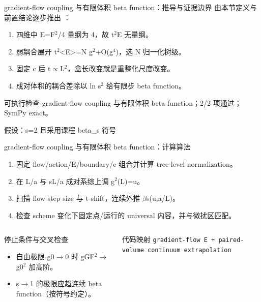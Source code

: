 \begin{frame}[t]{gradient-flow coupling 与有限体积 beta function：推导与证据边界}
\footnotesize
{}\quad 由本节定义与前置结论逐步推出 ：
\begin{enumerate}
\item 四维中 E=F\ensuremath{^{2}}/\allowbreak{}4 量纲为 4，故 t\ensuremath{^{2}}E 无量纲。
\item 弱耦合展开 t\ensuremath{^{2}}<E>=N g\ensuremath{^{2}}+O(g\ensuremath{^{4}})，选 N 归一化树级。
\item 固定 c 后 t\ensuremath{\propto}L\ensuremath{^{2}}，盒长改变就是重整化尺度改变。
\item 成对体积的耦合差除以 ln s\ensuremath{^{2}} 给有限步 beta function。
\end{enumerate}\begin{block}{可执行检查}
\quad gradient-flow coupling 与有限体积 beta function；2/2 项通过；SymPy exact。
\par\scriptsize 假设：s=2 且采用课程 beta\_s 符号
\end{block}
\end{frame}

\begin{frame}[t]{gradient-flow coupling 与有限体积 beta function：计算算法}
\footnotesize
{}\begin{enumerate}
\item 固定 flow/\allowbreak{}action/\allowbreak{}E/\allowbreak{}boundary/\allowbreak{}c 组合并计算 tree-level normalization。
\item 在 L/\allowbreak{}a 与 sL/\allowbreak{}a 成对系综上调 g\ensuremath{^{2}}(L)=u。
\item 扫描 flow step size 与 t-shift，连续外推 \ensuremath{\beta}s(u,a/\allowbreak{}L)。
\item 检查 scheme 变化下固定点/\allowbreak{}运行的 universal 内容，并与微扰区匹配。
\end{enumerate}\begin{columns}[T,onlytextwidth]
\begin{block}{停止条件与交叉检查}\scriptsize\begin{itemize}
\item[\CheckMark] 自由极限 g0\ensuremath{\rightarrow}0 时 gGF\ensuremath{^{2}}\ensuremath{\rightarrow}g0\ensuremath{^{2}} 加高阶。
\item[\CheckMark] s\ensuremath{\rightarrow}1 的极限应趋连续 beta function（按符号约定）。
\end{itemize}\end{block}
\begin{block}{代码映射}
\scriptsize \texttt{gradient-flow E + paired-volume continuum extrapolation}
\end{block}\end{columns}\end{frame}

